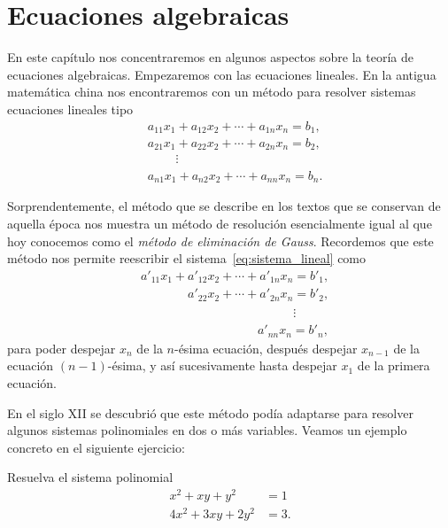 \chapter{Ecuaciones algebraicas}

En este capítulo nos concentraremos en algunos aspectos 
sobre la teoría de ecuaciones algebraicas. Empezaremos con
las ecuaciones lineales. En la antigua matemática china nos encontraremos con
un método para resolver sistemas ecuaciones lineales tipo 
\begin{equation}
\label{eq:sistema_lineal}
\begin{aligned}
	&a_{11}x_1+a_{12}x_2+\cdots+a_{1n}x_n=b_1,\\
	&a_{21}x_1+a_{22}x_2+\cdots+a_{2n}x_n=b_2,\\
	&\phantom{a_{11}x_1}\vdots\\
	&a_{n1}x_1+a_{n2}x_2+\cdots+a_{nn}x_n=b_n.
\end{aligned}
\end{equation}

Sorprendentemente, el método que se describe en los textos que se conservan 
de aquella época nos muestra un método de resolución 
esencialmente igual al que hoy conocemos como el \emph{método de
eliminación de Gauss}. Recordemos que este método 
nos permite reescribir el
sistema~\eqref{eq:sistema_lineal} como
\begin{equation*}
\begin{aligned}
	&a'_{11}x_1+a'_{12}x_2+\cdots+a'_{1n}x_n=b'_1,\\
	&\phantom{a'_{21}x_1+}a'_{22}x_2+\cdots+a'_{2n}x_n=b'_2,\\
	&\phantom{a'_{11}x_1+a'_{22}x_2+\cdots+a'_{2n}x_n}\vdots\\
	&\phantom{a'_{n1}x_1+a_{n2}x_2+\cdots+}a'_{nn}x_n=b'_n,
\end{aligned}
\end{equation*}
para poder despejar $x_n$ de la $n$-ésima ecuación, después despejar 
$x_{n-1}$ de la ecuación $(n-1)$-ésima, y así sucesivamente hasta 
despejar $x_1$ de la primera ecuación. 

En el siglo XII se descubrió que este método podía adaptarse para
resolver algunos sistemas polinomiales en dos o más variables. Veamos
un ejemplo concreto en el siguiente ejercicio:  

\begin{exercise}
	Resuelva 
	el sistema polinomial
	\begin{align*}
		 x^2+xy+y^2&=1\\
		 4x^2+3xy+2y^2&=3.
	\end{align*}
\end{exercise}

